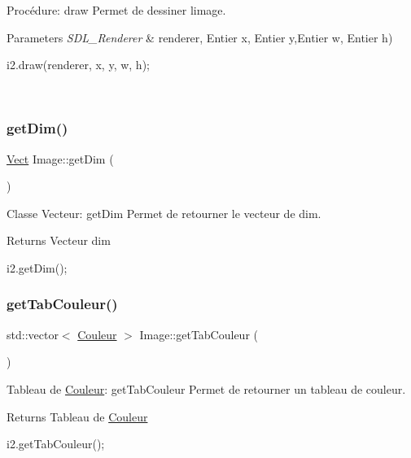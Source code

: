 Procédure\+: draw Permet de dessiner l\textquotesingle{}image. 


\begin{DoxyParams}{Parameters}
{\em S\+D\+L\+\_\+\+Renderer} & renderer, Entier x, Entier y,Entier w, Entier h) 
\begin{DoxyCode}
i2.draw(renderer, x, y, w, h);
\end{DoxyCode}
 \\
\hline
\end{DoxyParams}
\mbox{\label{classImage_a19886e6e2f661123224101aebdab0659}} 
\subsubsection{\texorpdfstring{get\+Dim()}{getDim()}}
{\footnotesize\ttfamily \hyperlink{classVect}{Vect} Image\+::get\+Dim (\begin{DoxyParamCaption}{ }\end{DoxyParamCaption})}



Classe Vecteur\+: get\+Dim Permet de retourner le vecteur de dim. 

\begin{DoxyReturn}{Returns}
Vecteur dim 
\begin{DoxyCode}
i2.getDim();
\end{DoxyCode}
 
\end{DoxyReturn}
\mbox{\label{classImage_a61a9499054fb7982ca74f7e408617df5}} 
\subsubsection{\texorpdfstring{get\+Tab\+Couleur()}{getTabCouleur()}}
{\footnotesize\ttfamily std\+::vector$<$ \hyperlink{classCouleur}{Couleur} $>$ Image\+::get\+Tab\+Couleur (\begin{DoxyParamCaption}{ }\end{DoxyParamCaption})}



Tableau de \hyperlink{classCouleur}{Couleur}\+: get\+Tab\+Couleur Permet de retourner un tableau de couleur. 

\begin{DoxyReturn}{Returns}
Tableau de \hyperlink{classCouleur}{Couleur} 
\begin{DoxyCode}
i2.getTabCouleur();
\end{DoxyCode}
 
\end{DoxyReturn}
\mbox{\label{classImage_ae9e27e310b4322d04366f2882f3a4242}} 
